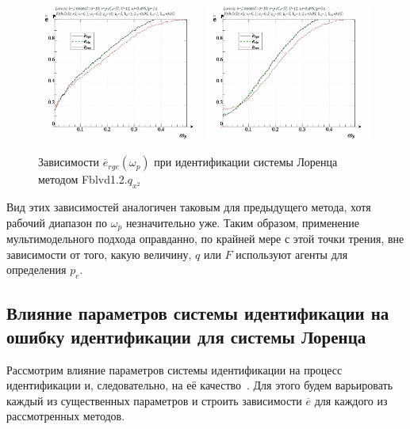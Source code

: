 \begin{figure}[ht!]
  \centerline{
    \includegraphics[width=0.49\textwidth]{p/cha/lor/Fq3zlovnAAF/lor_Fq3zlovnAAF_qx2-p_omega_p_e_sign.png}
    \hfill
    \includegraphics[width=0.49\textwidth]{p/cha/lor/Fq3zlovnAAF/lor_Fq3zlovnAAF_qx2-p_omega_p_e_sin.png}
  }
  \caption{Зависимости $\overline{e}_{rge}(\omega_p)$ при идентификации системы Лоренца методом Fblvd1.2.$q_{x^2}$}
  \label{atu:f:lor_Fq3zlovnAAF_e_omega_p}
\end{figure}

Вид этих зависимостей аналогичен таковым для предыдущего метода,
хотя рабочий диапазон по $\omega_p$ незначительно уже.
Таким образом, применение мультимодельного подхода
оправданно, по крайней мере с этой точки трения,
вне зависимости от того, какую величину, $q$ или $F$
используют агенты для определения $p_e$.




\subsection{Влияние параметров системы идентификации на ошибку идентификации для системы Лоренца}  %

Рассмотрим влияние параметров системы идентификации на
процесс идентификации и, следовательно, на её качество~\cite{atu_ISDMCI2014}.
Для этого будем варьировать каждый из существенных
параметров и строить зависимости $\overline{e}$
для каждого из рассмотренных методов.

